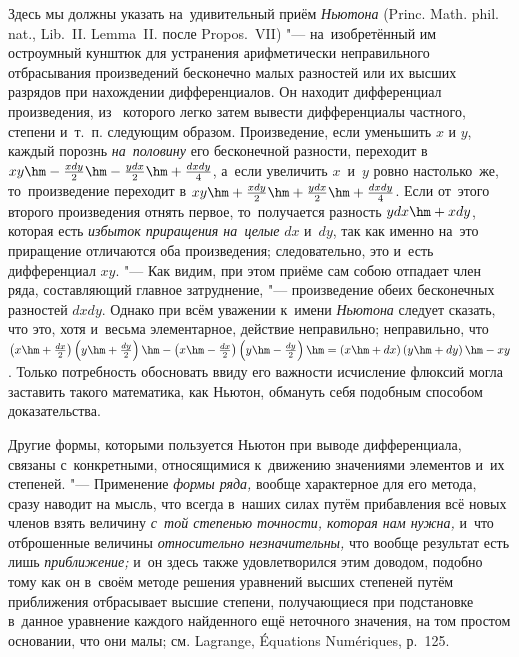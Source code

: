 \begin{midsloppypar}
Здесь мы должны указать на~удивительный приём \textit{Ньютона} (Princ. Math.
phil. nat., Lib.~II. Lemma~II. после Propos.~VII) "--- на~изобретённый им
остроумный кунштюк для устранения арифметически неправильного отбрасывания
произведений бесконечно малых разностей или их высших разрядов при
нахождении дифференциалов. Он находит дифференциал произведения, из~%
которого легко затем вывести дифференциалы частного, степени и~т.~п.
следующим образом. Произведение, если уменьшить $x$ и $y$, каждый порознь
{\em на~половину} его бесконечной разности, переходит в
$xy\hm-\frac{xdy}2\hm-\frac{ydx}2\hm+\frac{dxdy}4$, а~если увеличить
$x$~и~$y$ ровно настолько~же, то~произведение переходит в
$xy\hm+\frac{xdy}2\hm+\frac{ydx}2\hm+\frac{dxdy}4$. Если от~этого второго
произведения отнять первое, то~получается разность $ydx\hm+xdy$, которая есть
{\em избыток приращения на~целые} $dx$ и~$dy$, так как именно на~это приращение
отличаются оба произведения; следовательно, это и~есть дифференциал $xy$. "---
Как видим, при этом приёме сам собою отпадает член ряда, составляющий главное
затруднение, "--- произведение обеих бесконечных разностей $dxdy$. Однако при
всём уважении к~имени {\em Ньютона} следует сказать, что это, хотя и~весьма элементарное,
действие неправильно; неправильно, что
$\left(x\hm+\frac{dx}2\right)\left(y\hm+\frac{dy}2\right)\hm-
\left(x\hm-\frac{dx}2\right)\left(y\hm-\frac{dy}2\right)\hm=
\left(x\hm+dx\right)\left(y\hm+dy\right)\hm-xy$. Только потребность обосновать
ввиду его важности исчисление флюксий могла заставить такого математика, как
Ньютон, обмануть себя подобным способом доказательства.
\end{midsloppypar}

Другие формы, которыми пользуется Ньютон при выводе дифференциала, связаны
с~конкретными, относящимися к~движению значениями элементов и~их степеней. "---
Применение {\em формы ряда,} вообще характерное для его метода,
сразу наводит на мысль, что всегда в~наших силах путём
прибавления всё новых членов взять величину
{\em с~той степенью точности, которая нам нужна,} и~что отброшенные
величины {\em относительно незначительны,} что вообще результат
есть лишь {\em приближение;} и~он здесь
также удовлетворился этим доводом, подобно тому как он в~своём методе
решения уравнений высших степеней путём приближения отбрасывает высшие
степени, получающиеся при подстановке в~данное уравнение каждого найденного
ещё неточного значения, на том простом основании, что они малы;
см. Lagrange, Équa\-ti\-ons Nu\-mé\-ri\-ques, р.~125.

